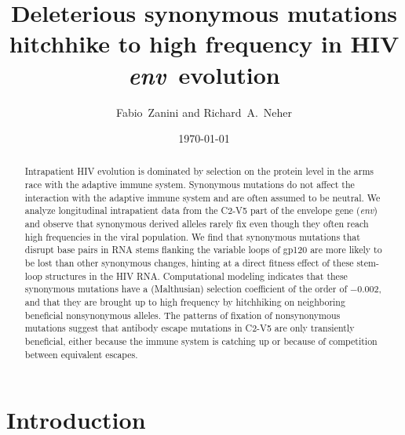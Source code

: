 \documentclass[rmp, twocolumn]{revtex4}
\newcommand{\env}{\textit{env}}
\newcommand{\shankaregion}{C2-V5}
\newcommand{\Author}{Fabio~Zanini and Richard~A.~Neher}
\newcommand{\Title}{Deleterious synonymous mutations hitchhike to high frequency in HIV \env~evolution}
\begin{document}
\title{\Title}
\author{\Author}
\date{\today}

\begin{abstract}
\noindent

Intrapatient HIV evolution is dominated by selection on the protein level in the
arms race with the adaptive immune system. Synonymous mutations do not affect 
the interaction with the adaptive immune system and are often
assumed to be neutral.
We analyze longitudinal intrapatient data from the \shankaregion{} part of the
envelope gene (\env{}) and observe that synonymous derived alleles rarely
fix even though they often reach high frequencies in the viral population.
We find that synonymous mutations that disrupt base pairs in RNA stems flanking
the variable loops of gp120 are more likely to be lost than other synonymous
changes, hinting at a direct fitness effect of these stem-loop structures in the
HIV RNA.
Computational modeling indicates that these synonymous mutations have a
(Malthusian) selection coefficient of the order of $-0.002$, and that they are brought up to high
frequency by hitchhiking on neighboring beneficial nonsynonymous alleles.
The patterns of fixation of nonsynonymous mutations suggest that antibody
escape mutations in \shankaregion{} are only transiently beneficial, either
because the immune system is catching up or because of competition between equivalent
escapes.

\end{abstract}
\maketitle
\section{Introduction}
\end{document}
